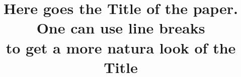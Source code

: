 \def\volinfo{\textsc{Vol.} \textbf{\currentvolume}, No. \textbf{\currentissue}}
\def\publname{Mathematica Moravica}
\def\copyrightyear{2019}
\def\copyrightholder{Mathematica Moravica}
\def\currentvolume{23}
\def\currentmonth{}
\def\currentyear{2019}
\def\currentissue{2}





\newtheorem{theorem}{Theorem}[section]
\newtheorem{proposition}{Proposition}[section]
\newtheorem{corollary}{Corollary}[section]
\newtheorem{lemma}{Lemma}[section]

\theoremstyle{definition}
\newtheorem{definition}{Definition}[section]
\newtheorem{remark}{Remark}[section]
\newtheorem{example}{Example}[section]

%
\newcommand\dd{\mathbf{d}}     %
%
%
%




\long{}




\title[Here goes short title intended for headers if full title is too long]
{Here goes the Title of the paper. One can use line breaks \\
to get a more natura look of the Title}

